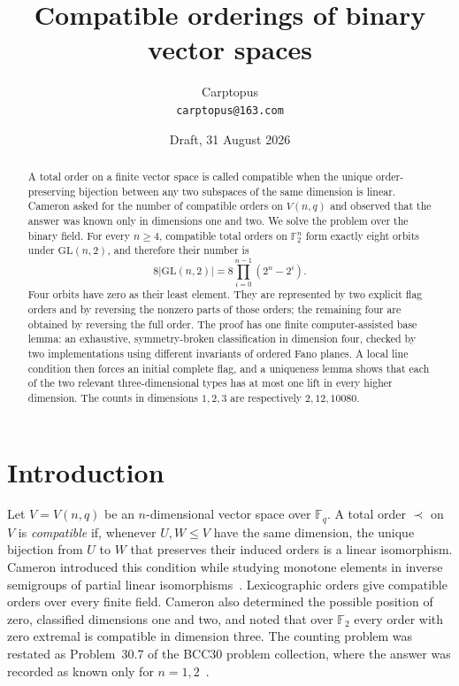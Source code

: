 \documentclass[11pt]{article}
\title{Compatible orderings of binary vector spaces}
\author{Carptopus\\\small\texttt{carptopus@163.com}}
\date{Draft, 31 August 2026}
\begin{document}
\maketitle

\begin{abstract}
A total order on a finite vector space is called compatible when the unique
order-preserving bijection between any two subspaces of the same dimension is
linear. Cameron asked for the number of compatible orders on $V(n,q)$ and
observed that the answer was known only in dimensions one and two. We solve the
problem over the binary field. For every $n\ge4$, compatible total orders on
$\mathbb F_2^n$ form exactly eight orbits under $\mathrm{GL}(n,2)$, and
therefore their number is
\[
8|\mathrm{GL}(n,2)|=8\prod_{i=0}^{n-1}(2^n-2^i).
\]
Four orbits have zero as their least element. They are represented by two
explicit flag orders and by reversing the nonzero parts of those orders; the
remaining four are obtained by reversing the full order. The proof has one
finite computer-assisted base lemma: an exhaustive, symmetry-broken
classification in dimension four, checked by two implementations using
different invariants of ordered Fano planes. A local line condition then
forces an initial complete flag, and a uniqueness lemma shows that each of the
two relevant three-dimensional types has at most one lift in every higher
dimension. The counts in dimensions $1,2,3$ are respectively $2,12,10080$.
\end{abstract}

\section{Introduction}

Let $V=V(n,q)$ be an $n$-dimensional vector space over $\mathbb F_q$. A
total order $\prec$ on $V$ is \emph{compatible} if, whenever $U,W\le V$ have
the same dimension, the unique bijection from $U$ to $W$ that preserves their
induced orders is a linear isomorphism. Cameron introduced this condition
while studying monotone elements in inverse semigroups of partial linear
isomorphisms~\cite{cameron-notes}. Lexicographic orders give compatible orders
over every finite field. Cameron also determined the possible position of
zero, classified dimensions one and two, and noted that over $\mathbb F_2$
every order with zero extremal is compatible in dimension three. The counting
problem was restated as Problem~30.7 of the BCC30 problem collection, where the
answer was recorded as known only for $n=1,2$~\cite{bcc30}.
\end{document}
